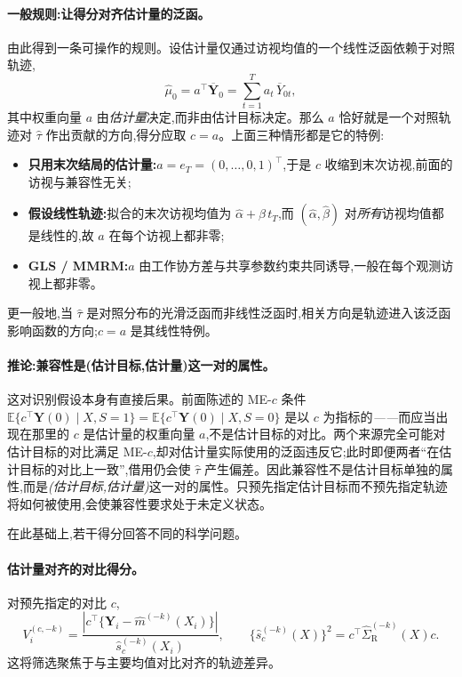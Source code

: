 \documentclass[11pt]{article}
\newcommand{\R}{\mathrm{R}}
\newcommand{\Exp}{\mathbb{E}}
\begin{document}
\paragraph{一般规则:让得分对齐估计量的泛函。}
由此得到一条可操作的规则。设估计量仅通过访视均值的一个线性泛函依赖于对照轨迹,
\[
\widehat\mu_0=a^{\top}\overline{\bm Y}_0
=\sum_{t=1}^{T}a_t\,\overline{Y}_{0t},
\]
其中权重向量 $a$ 由\emph{估计量}决定,而非由估计目标决定。那么 $a$ 恰好就是一个对照轨迹对 $\widehat\tau$ 作出贡献的方向,得分应取 $c=a$。上面三种情形都是它的特例:
\begin{itemize}[leftmargin=*,itemsep=2pt,topsep=3pt]
\item \textbf{只用末次结局的估计量:}$a=e_T=(0,\dots,0,1)^{\top}$,于是 $c$ 收缩到末次访视,前面的访视与兼容性无关;
\item \textbf{假设线性轨迹:}拟合的末次访视均值为 $\widehat\alpha+\widehat\beta\,t_T$,而 $(\widehat\alpha,\widehat\beta)$ 对\emph{所有}访视均值都是线性的,故 $a$ 在每个访视上都非零;
\item \textbf{GLS / MMRM:}$a$ 由工作协方差与共享参数约束共同诱导,一般在每个观测访视上都非零。
\end{itemize}
更一般地,当 $\widehat\tau$ 是对照分布的光滑泛函而非线性泛函时,相关方向是轨迹进入该泛函影响函数的方向;$c=a$ 是其线性特例。

\paragraph{推论:兼容性是(估计目标,估计量)这一对的属性。}
这对识别假设本身有直接后果。前面陈述的 ME-$c$ 条件
$\Exp\{c^{\top}\bm Y(0)\mid X,S=1\}=\Exp\{c^{\top}\bm Y(0)\mid X,S=0\}$
是以 $c$ 为指标的\emph{——}而应当出现在那里的 $c$ 是估计量的权重向量 $a$,不是估计目标的对比。两个来源完全可能对估计目标的对比满足 ME-$c$,却对估计量实际使用的泛函违反它;此时即便两者``在估计目标的对比上一致'',借用仍会使 $\widehat\tau$ 产生偏差。因此兼容性不是估计目标单独的属性,而是\emph{(估计目标,估计量)}这一对的属性。只预先指定估计目标而不预先指定轨迹将如何被使用,会使兼容性要求处于未定义状态。

在此基础上,若干得分回答不同的科学问题。

\paragraph{估计量对齐的对比得分。}
对预先指定的对比 $c$,
\[
V_i^{(c,-k)}
=
\frac{\left|c^{\top}\{\bm Y_i-\widehat m^{(-k)}(X_i)\}\right|}
{\widehat s_c^{(-k)}(X_i)},
\qquad
\{\widehat s_c^{(-k)}(X)\}^2
=c^{\top}\widehat\Sigma_{\R}^{(-k)}(X)c.
\tag{3}
\]
这将筛选聚焦于与主要均值对比对齐的轨迹差异。
\end{document}
